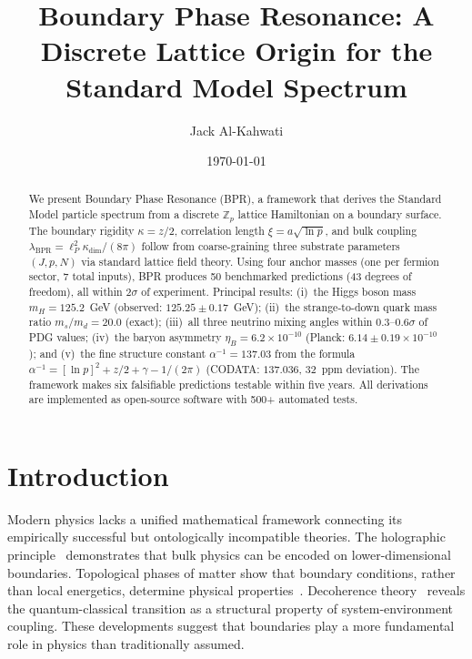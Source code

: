 \documentclass[prd,twocolumn,amsmath,amssymb]{revtex4-2}
\begin{document}
\title{Boundary Phase Resonance: A Discrete Lattice Origin for the Standard Model Spectrum}

\author{Jack Al-Kahwati}

\date{\today}

\begin{abstract}
We present Boundary Phase Resonance (BPR), a framework that derives the Standard Model particle spectrum from a discrete $\mathbb{Z}_p$ lattice Hamiltonian on a boundary surface. The boundary rigidity $\kappa = z/2$, correlation length $\xi = a\sqrt{\ln p}$, and bulk coupling $\lambda_{\mathrm{BPR}} = \ell_P^2\kappa_{\mathrm{dim}}/(8\pi)$ follow from coarse-graining three substrate parameters $(J, p, N)$ via standard lattice field theory. Using four anchor masses (one per fermion sector, 7 total inputs), BPR produces 50 benchmarked predictions (43 degrees of freedom), all within $2\sigma$ of experiment. Principal results: (i)~the Higgs boson mass $m_H = 125.2$~GeV (observed: $125.25 \pm 0.17$~GeV); (ii)~the strange-to-down quark mass ratio $m_s/m_d = 20.0$ (exact); (iii)~all three neutrino mixing angles within $0.3$--$0.6\sigma$ of PDG values; (iv)~the baryon asymmetry $\eta_B = 6.2 \times 10^{-10}$ (Planck: $6.14 \pm 0.19 \times 10^{-10}$); and (v)~the fine structure constant $\alpha^{-1} = 137.03$ from the formula $\alpha^{-1} = [\ln p]^2 + z/2 + \gamma - 1/(2\pi)$ (CODATA: $137.036$, 32~ppm deviation). The framework makes six falsifiable predictions testable within five years. All derivations are implemented as open-source software with 500+ automated tests.
\end{abstract}


\maketitle

\section{Introduction}
\label{sec:intro}

Modern physics lacks a unified mathematical framework connecting its empirically successful but ontologically incompatible theories. The holographic principle~\cite{Maldacena1998,Ryu2006} demonstrates that bulk physics can be encoded on lower-dimensional boundaries. Topological phases of matter show that boundary conditions, rather than local energetics, determine physical properties~\cite{Hasan2010,Qi2011}. Decoherence theory~\cite{Zurek2003,Schlosshauer2005} reveals the quantum-classical transition as a structural property of system-environment coupling. These developments suggest that boundaries play a more fundamental role in physics than traditionally assumed.
\end{document}
